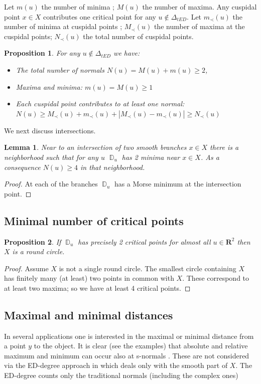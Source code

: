 \documentclass[12pt,a4,twoside]{amsart}
\DeclareMathOperator{\sq}{\mathbb{D}}
\newtheorem{prop}{Proposition}
\newtheorem{lemma}{Lemma}
\newtheorem*{main lemma}{The main lemma}
\begin{document}
Let $m(u)$ the number of minima ; $M(u)$ the number of maxima. 
Any cuspidal point $x \in X$ contributes one critical point for any $u \notin \Delta_{tED}$. 
Let $m_{\prec}(u)$ the number of minima at cuspidal points ; $M_{\prec}(u)$ the number of maxima at the cuspidal points; $N_{\prec}(u)$ the total number of cuspidal points.
\begin{prop}\label{p:count-normals}
For any $u \notin \Delta_{tED}$  we have:
\begin{itemize}
\item The total number of normals $N(u)  = M(u) + m(u) \ge 2$,
\item Maxima and minima: $m(u)=M(u) \ge 1$ 
\item Each cuspidal point contributes to at least one normal:\\
$ N(u)   \ge M_{\prec}(u) + m_{\prec}(u) + | M_{\prec}(u)-m_{\prec}(u)|  \ge  N_{\prec}(u)$
\end{itemize}
\end{prop}




We next discuss intersections.
\begin{lemma}
Near to an intersection of two smooth branches  $x \in X$ there is a neighborhood such that for any $u$  $\sq_u$ has 2 minima near $x \in X$. As a consequence $N(u) \ge 4$ in that neighborhood.
\end{lemma}
\begin{proof}
At each of the branches $\sq_u$ has a Morse minimum at the intersection point.
\end{proof}


\subsection{Minimal number of critical points}
\begin{prop}
If $\sq_u$ has precisely 2 critical points for almost all $u \in \mathbf{R}^2$  then $X$ is a round circle.
\end{prop}
\begin{proof}
Assume $X$ is not a single round circle.  The smallest circle containing $X$ has finitely many (at least) two points in common with $X$. These correspond to at least two maxima;  so we have at least 4 critical points.
\end{proof}





\subsection{ Maximal and minimal distances}
In several applications one is interested in the maximal or minimal distance from a point $y$ to the object.
It is clear (see the examples) that absolute and relative  maximum and minimum can occur also  at s-normals . These are not considered  via the ED-degree approach in \cite{DHOST}  which deals only with the smooth part of $X$. The ED-degree counts only the traditional normals (including the complex ones)\\
\end{document}
